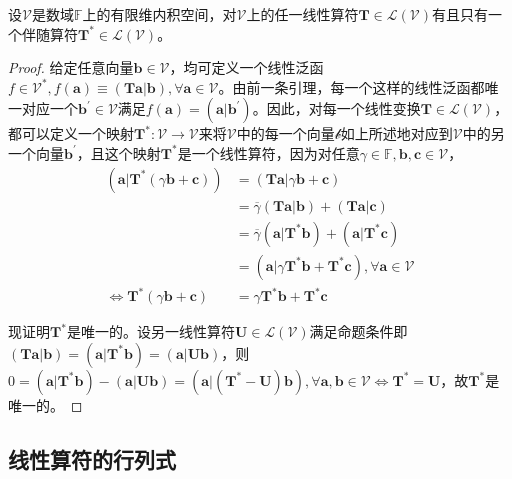 \documentclass[main.tex]{subfiles}
\begin{document}
\begin{theorem}
设$\mathcal{V}$是数域$\mathbb{F}$上的有限维内积空间，对$\mathcal{V}$上的任一线性算符$\mathbf{T}\in\mathcal{L}\left(\mathcal{V}\right)$有且只有一个伴随算符$\mathbf{T}^*\in\mathcal{L}\left(\mathcal{V}\right)$。
\end{theorem}
\begin{proof}
给定任意向量$\mathbf{b}\in\mathcal{V}$，均可定义一个线性泛函$f\in\mathcal{V}^*,f\left(\mathbf{a}\right)\equiv\left(\mathbf{Ta}|\mathbf{b}\right),\forall\mathbf{a}\in\mathcal{V}$。由前一条引理，每一个这样的线性泛函都唯一对应一个$\mathbf{b}^\prime\in\mathcal{V}$满足$f\left(\mathbf{a}\right)=\left(\mathbf{a}|\mathbf{b}^\prime\right)$。因此，对每一个线性变换$\mathbf{T}\in\mathcal{L}\left(\mathcal{V}\right)$，都可以定义一个映射$\mathbf{T}^*:\mathcal{V}\rightarrow\mathcal{V}$来将$\mathcal{V}$中的每一个向量$\mathcal{b}$如上所述地对应到$\mathcal{V}$中的另一个向量$\mathbf{b}^\prime$，且这个映射$\mathbf{T}^*$是一个线性算符，因为对任意$\gamma\in\mathbb{F},\mathbf{b},\mathbf{c}\in\mathcal{V}$，
\begin{align*}
    \left(\mathbf{a}|\mathbf{T}^*\left(\gamma\mathbf{b}+\mathbf{c}\right)\right)&=\left(\mathbf{Ta}|\gamma\mathbf{b}+\mathbf{c}\right)\\
    &=\overline{\gamma}\left(\mathbf{Ta}|\mathbf{b}\right)+\left(\mathbf{Ta}|\mathbf{c}\right)\\
    &=\overline{\gamma}\left(\mathbf{a}|\mathbf{T}^*\mathbf{b}\right)+\left(\mathbf{a}|\mathbf{T}^*\mathbf{c}\right)\\
    &=\left(\mathbf{a}|\gamma\mathbf{T}^*\mathbf{b}+\mathbf{T}^*\mathbf{c}\right),\forall\mathbf{a}\in\mathcal{V}\\
    \Leftrightarrow\mathbf{T}^*\left(\gamma\mathbf{b}+\mathbf{c}\right)&=\gamma\mathbf{T}^*\mathbf{b}+\mathbf{T}^*\mathbf{c}
\end{align*}

现证明$\mathbf{T}^*$是唯一的。设另一线性算符$\mathbf{U}\in\mathcal{L}\left(\mathcal{V}\right)$满足命题条件即$\left(\mathbf{Ta}|\mathbf{b}\right)=\left(\mathbf{a}|\mathbf{T}^*\mathbf{b}\right)=\left(\mathbf{a}|\mathbf{Ub}\right)$，则$0=\left(\mathbf{a}|\mathbf{T}^*\mathbf{b}\right)-\left(\mathbf{a}|\mathbf{Ub}\right)=\left(\mathbf{a}|\left(\mathbf{T}^*-\mathbf{U}\right)\mathbf{b}\right),\forall\mathbf{a},\mathbf{b}\in\mathcal{V}\Leftrightarrow\mathbf{T}^*=\mathbf{U}$，故$\mathbf{T}^*$是唯一的。
\end{proof}

\subsection{线性算符的行列式}
\end{document}
